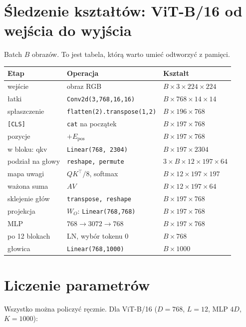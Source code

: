 \documentclass[11pt,a4paper]{article}
\begin{document}
\section{Śledzenie kształtów: ViT-B/16 od wejścia do wyjścia}
Batch $B$ obrazów. To jest tabela, którą warto umieć odtworzyć z pamięci.

\begin{center}
\begin{tabular}{@{}lll@{}}
\toprule
Etap & Operacja & Kształt \\
\midrule
wejście & obraz RGB & $B\times3\times224\times224$ \\
łatki & \texttt{Conv2d(3,768,16,16)} & $B\times768\times14\times14$ \\
spłaszczenie & \texttt{flatten(2).transpose(1,2)} & $B\times196\times768$ \\
\texttt{[CLS]} & \texttt{cat} na początek & $B\times197\times768$ \\
pozycje & $+E_{\text{pos}}$ & $B\times197\times768$ \\
\midrule
w bloku: qkv & \texttt{Linear(768, 2304)} & $B\times197\times2304$ \\
podział na głowy & \texttt{reshape, permute} & $3\times B\times12\times197\times64$ \\
mapa uwagi & $QK^\top/8$, softmax & $B\times12\times197\times197$ \\
ważona suma & $AV$ & $B\times12\times197\times64$ \\
sklejenie głów & \texttt{transpose, reshape} & $B\times197\times768$ \\
projekcja & $W_O$: \texttt{Linear(768,768)} & $B\times197\times768$ \\
MLP & $768\to3072\to768$ & $B\times197\times768$ \\
\midrule
po 12 blokach & LN, wybór tokenu 0 & $B\times768$ \\
głowica & \texttt{Linear(768,1000)} & $B\times1000$ \\
\bottomrule
\end{tabular}
\end{center}

\section{Liczenie parametrów}
Wszystko można policzyć ręcznie. Dla ViT-B/16 ($D=768$, $L=12$, MLP $4D$, $K=1000$):
\end{document}
